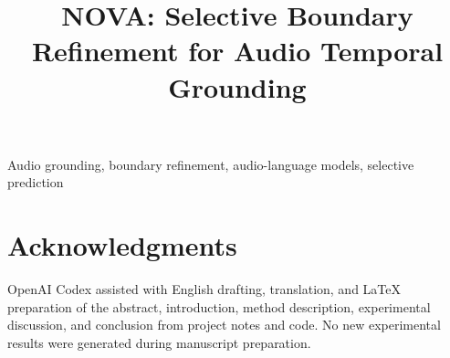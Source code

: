 \documentclass[10pt,letterpaper]{article}
\title{\fontsize{14}{16}\selectfont NOVA: Selective Boundary Refinement for Audio Temporal Grounding}
\begin{document}
\maketitle

\begin{keywords}
Audio grounding, boundary refinement, audio-language models, selective prediction
\end{keywords}









\section{Acknowledgments}
OpenAI Codex assisted with English drafting, translation, and LaTeX preparation of the abstract, introduction, method description, experimental discussion, and conclusion from project notes and code. No new experimental results were generated during manuscript preparation.

\clearpage
\balance


\end{document}
